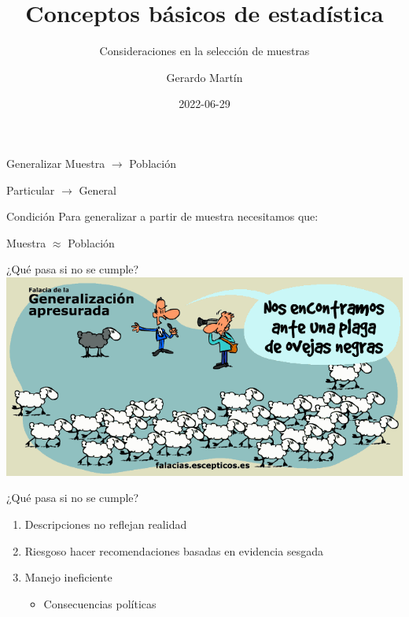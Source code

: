 \documentclass[
  11pt,
  ignorenonframetext,
]{beamer}
\title{Conceptos básicos de estadística}
\subtitle{Consideraciones en la selección de muestras}
\author{Gerardo Martín}
\date{2022-06-29}
\providecommand{\tightlist}{%
  \setlength{\itemsep}{0pt}\setlength{\parskip}{0pt}}
\begin{document}
\frame{\titlepage}

\begin{frame}{Generalizar}
\protect\hypertarget{generalizar}{}
Muestra \(\rightarrow\) Población

Particular \(\rightarrow\) General
\end{frame}

\begin{frame}{Condición}
\protect\hypertarget{condiciuxf3n}{}
Para generalizar a partir de muestra necesitamos que:

Muestra \(\approx\) Población
\end{frame}

\begin{frame}{¿Qué pasa si no se cumple?}
\protect\hypertarget{quuxe9-pasa-si-no-se-cumple}{}
\includegraphics{Figuras-poblacion/Sesgo.png}
\end{frame}

\begin{frame}{¿Qué pasa si no se cumple?}
\protect\hypertarget{quuxe9-pasa-si-no-se-cumple-1}{}
\begin{enumerate}
\item
  Descripciones no reflejan realidad
\item
  Riesgoso hacer recomendaciones basadas en evidencia sesgada
\item
  Manejo ineficiente

  \begin{itemize}
  \tightlist
  \item
    Consecuencias políticas
  \end{itemize}
\end{enumerate}
\end{frame}
\end{document}
